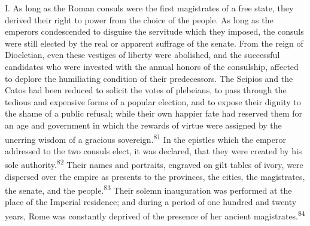 



I. As long as the Roman consuls were the first magistrates of a
free state, they derived their right to power from the choice of
the people. As long as the emperors condescended to disguise the
servitude which they imposed, the consuls were still elected by
the real or apparent suffrage of the senate. From the reign of
Diocletian, even these vestiges of liberty were abolished, and
the successful candidates who were invested with the annual
honors of the consulship, affected to deplore the humiliating
condition of their predecessors. The Scipios and the Catos had
been reduced to solicit the votes of plebeians, to pass through
the tedious and expensive forms of a popular election, and to
expose their dignity to the shame of a public refusal; while
their own happier fate had reserved them for an age and
government in which the rewards of virtue were assigned by the
unerring wisdom of a gracious sovereign.\textsuperscript{81} In the epistles which
the emperor addressed to the two consuls elect, it was declared,
that they were created by his sole authority.\textsuperscript{82} Their names and
portraits, engraved on gilt tables of ivory, were dispersed over
the empire as presents to the provinces, the cities, the
magistrates, the senate, and the people.\textsuperscript{83} Their solemn
inauguration was performed at the place of the Imperial
residence; and during a period of one hundred and twenty years,
Rome was constantly deprived of the presence of her ancient
magistrates.\textsuperscript{84}



